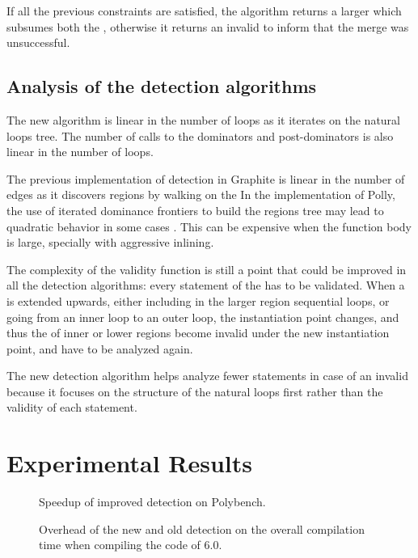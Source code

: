 \documentclass{sig-alternate}
\begin{document}
If all the previous constraints are satisfied, the algorithm returns a larger
\SESE{} which subsumes both the , otherwise it returns an invalid \SESE{} to
inform that the merge was unsuccessful.

\subsection{Analysis of the \SCoP{} detection algorithms}
The new algorithm is linear in the number of loops as it iterates on the
natural loops tree.  The number of calls to the dominators and post-dominators
is also linear in the number of loops.

The previous implementation of \SCoP{} detection in Graphite is linear in the
number of \CFG{} edges as it discovers regions by walking on the   In the
implementation of Polly, the use of iterated dominance frontiers to build the
\SESE{} regions tree may lead to quadratic behavior in some cases \cite{ramalingam}.
This can be expensive when the function body is large, specially with aggressive
inlining.

The complexity of the validity function is still a point that could be improved
in all the \SCoP{} detection algorithms: every statement of the \SESE{} has to be
validated.  When a \SCoP{} is extended upwards, either including in the larger
region sequential loops, or going from an inner loop to an outer loop, the \scev{}
instantiation point changes, and thus the  of inner or lower regions become
invalid under the new instantiation point, and have to be analyzed again.

The new \SCoP{} detection algorithm helps analyze fewer statements in case of an
invalid \SCoP{} because it focuses on the structure of the natural loops first
rather than the validity of each statement.

\section{Experimental Results}

\begin {figure}
  \begin{center}
    \resizebox{\linewidth}{!}{}
  \end{center}
  \caption{Speedup of improved \SCoP{} detection on Polybench.}
  \label{fig:polybench-speedup}
\end {figure}

\begin {figure}
  \begin{center}
    \resizebox{\linewidth}{!}{}
  \end{center}
  \caption{Overhead of the new and old \SCoP{} detection on the overall compilation
    time when compiling the code of \GCC{} 6.0.}
  \label{fig:gcc-speedup}
\end {figure}
\end{document}
